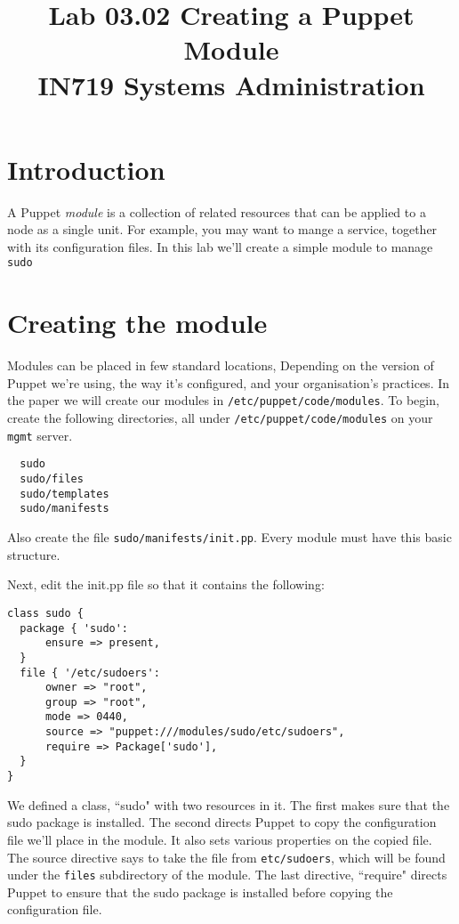 \documentclass{article}   	%
\title{Lab 03.02 Creating a Puppet Module \\ IN719 Systems Administration}
\date{}							%
\begin{document}
\maketitle

\section*{Introduction}
A Puppet \emph{module} is a collection of related resources that can be applied to a node as a single unit. For example, you may want to mange a service, together with its configuration files.  In this lab we'll create a simple module to manage \texttt{sudo}

\section*{Creating the module}
Modules can be placed in few standard locations, Depending on the version of Puppet we're using, the way it's configured, and your organisation's practices.  In the paper we will create our modules in \texttt{/etc/puppet/code/modules}.  To begin, create the following directories, all under \texttt{/etc/puppet/code/modules} on your \texttt{mgmt} server.
\begin{verbatim}
  sudo
  sudo/files
  sudo/templates
  sudo/manifests
\end{verbatim}
Also create the file \texttt{sudo/manifests/init.pp}.  Every module must have this basic structure.

Next, edit the init.pp file so that it contains the following:


\begin{verbatim}
class sudo {
  package { 'sudo':
      ensure => present,
  }
  file { '/etc/sudoers':
      owner => "root",
      group => "root",
      mode => 0440,
      source => "puppet:///modules/sudo/etc/sudoers",
      require => Package['sudo'],
  }
}
\end{verbatim}

We defined a class, ``sudo" with two resources in it.  The first makes sure that the sudo package is installed.  The second directs Puppet to copy the configuration file we'll place in the module.  It also sets various properties on the copied file.  The source directive says to take the file from \texttt{etc/sudoers}, which will be found under the \texttt{files} subdirectory of the module.  The last directive, ``require" directs Puppet to ensure that the sudo package is installed before copying the configuration file.
\end{document}

